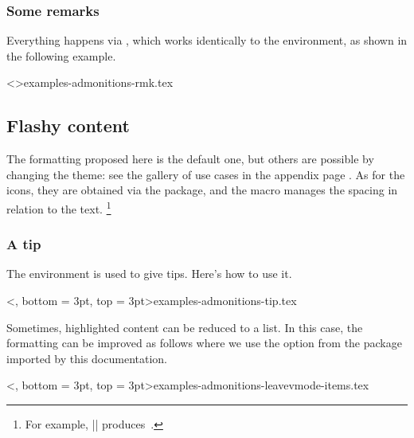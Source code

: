 \subsubsection{Some remarks}

Everything happens via , which works identically to the  environment, as shown in the following example.

\tdoclatexinput<>{examples-admonitions-rmk.tex}


\subsection{Flashy content}
\label{tutodoc-admonitions}

\begin{tdocnote}
    The formatting proposed here is the default one, but others are possible by changing the theme: see the gallery of use cases in the appendix page \pageref{tutodoc-theme-gallery}.
    As for the icons, they are obtained via the  package, and the  macro manages the spacing in relation to the text.%
    \footnote{
        For example,
        \tdoclatexin||
        produces
        \,.
    }
\end{tdocnote}


\subsubsection{A tip}

The  environment is used to give tips. Here's how to use it.

\tdoclatexinput<, bottom = 3pt, top = 3pt>{examples-admonitions-tip.tex}


\smallskip


\begin{tdoctip}
    Sometimes, highlighted content can be reduced to a list. In this case, the formatting can be improved as follows where we use the  option from the  package imported by this documentation.

    \tdoclatexinput<, bottom = 3pt, top = 3pt>{examples-admonitions-leavevmode-items.tex}
\end{tdoctip}


